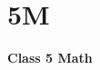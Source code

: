 \label{2 C5 Math}
    \section{5M}
    \begin{frame}
    \begin{center}
    \begin{Huge}
        \textbf{Class 5 Math}
    \end{Huge}
    \end{center}
    \end{frame}
 
    